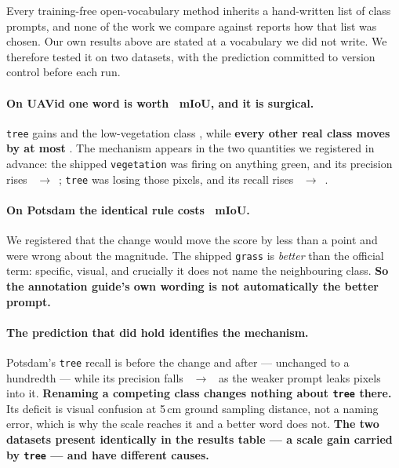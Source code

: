 \documentclass[10pt,twocolumn,letterpaper]{article}          %
\newcommand{\best}[1]{\textbf{#1}}
\begin{document}
Every training-free open-vocabulary method inherits a hand-written list of class
prompts, and none of the work we compare against reports how that list was chosen.
Our own results above are stated at a vocabulary we did not write. We therefore
tested it on two datasets, with the prediction committed to version control before
each run.

\paragraph{On UAVid one word is worth \vocUavGain{}~mIoU, and it is surgical.}
\texttt{tree} gains \vocUavTree{} and the low-vegetation class \vocUavVeg{}, while
\best{every other real class moves by at most \vocUavElse{}}. The mechanism appears in
the two quantities we registered in advance: the shipped \texttt{vegetation} was
firing on anything green, and its precision rises
\vocUavVegPrecA{}~$\to$~\vocUavVegPrecB{}; \texttt{tree} was losing those pixels, and
its recall rises \vocUavTreeRecA{}~$\to$~\vocUavTreeRecB{}.

\paragraph{On Potsdam the identical rule \best{costs} \vocPotsGain{}~mIoU.} We
registered that the change would move the score by less than a point and were wrong
about the magnitude. The shipped \texttt{grass} is \emph{better} than the official
term: specific, visual, and crucially it does not name the neighbouring class. \best{So
the annotation guide's own wording is not automatically the better prompt.}

\paragraph{The prediction that did hold identifies the mechanism.} Potsdam's
\texttt{tree} recall is \vocPotsTreeRec{} before the change and \vocPotsTreeRec{}
after --- unchanged to a hundredth --- while its precision falls
\vocPotsTreePrecA{}~$\to$~\vocPotsTreePrecB{} as the weaker prompt leaks pixels into
it. \best{Renaming a competing class changes nothing about \texttt{tree} there.} Its
deficit is visual confusion at 5\,cm ground sampling distance, not a naming error,
which is why the scale reaches it and a better word does not. \best{The two datasets
present identically in the results table --- a scale gain carried by \texttt{tree} ---
and have different causes.}
\end{document}
